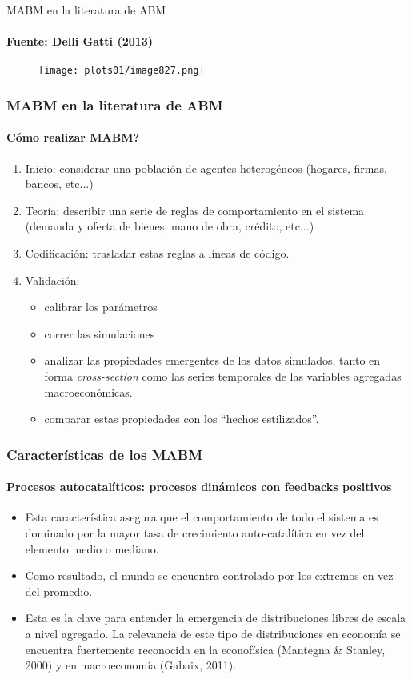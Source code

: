 \documentclass[11pt]{beamer}
\begin{document}
\begin{frame}{MABM en la literatura de ABM}
\framesubtitle{Fuente: Delli Gatti (2013)}
\begin{figure}
    \centering
    \texttt{[image: plots01/image827.png]}
    \label{fig:my_label}
\end{figure}
    
\end{frame}


\begin{frame}
	\frametitle{MABM en la literatura de ABM}
	\framesubtitle{Cómo realizar MABM?}
\begin{enumerate}
    \item Inicio: considerar una población de agentes heterogéneos (hogares, firmas, bancos, etc...)
    \item Teoría: describir una serie de reglas de comportamiento en el sistema (demanda y oferta de bienes, mano de obra, crédito, etc...)
    \item Codificación: trasladar estas reglas a líneas de código.
    \item Validación: 
    \begin{itemize}
        \item calibrar los parámetros
        \item correr las simulaciones
        \item analizar las propiedades emergentes de los datos simulados, tanto en forma \textit{cross-section} como las series temporales de las variables agregadas macroeconómicas.
        \item comparar estas propiedades con los ``hechos estilizados''.
    \end{itemize}
    
\end{enumerate}
\end{frame}

\begin{frame}
	\frametitle{Características de los MABM}
	\framesubtitle{Procesos autocatalíticos: procesos dinámicos con feedbacks positivos}
\begin{itemize}
    \item Esta característica asegura que el comportamiento de todo el sistema es dominado por la mayor tasa de crecimiento auto-catalítica en vez del elemento medio o mediano.
    \item Como resultado, el mundo se encuentra controlado por los extremos en vez del promedio.
    \item Esta es la clave para entender la emergencia de distribuciones libres de escala a nivel agregado. La relevancia de este tipo de distribuciones en economía se encuentra fuertemente reconocida en la econofísica (Mantegna \& Stanley, 2000) y en macroeconomía (Gabaix, 2011).
\end{itemize}
\end{frame}
\end{document}
